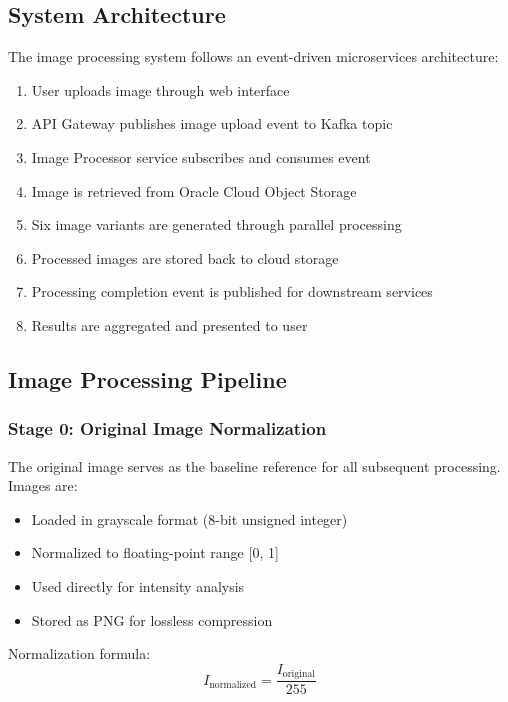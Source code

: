\documentclass[12pt,a4paper]{article}
\begin{document}
\subsection{System Architecture}

The image processing system follows an event-driven microservices architecture:

\begin{enumerate}
    \item User uploads image through web interface
    \item API Gateway publishes image upload event to Kafka topic
    \item Image Processor service subscribes and consumes event
    \item Image is retrieved from Oracle Cloud Object Storage
    \item Six image variants are generated through parallel processing
    \item Processed images are stored back to cloud storage
    \item Processing completion event is published for downstream services
    \item Results are aggregated and presented to user
\end{enumerate}

\subsection{Image Processing Pipeline}

\subsubsection{Stage 0: Original Image Normalization}

The original image serves as the baseline reference for all subsequent processing. Images are:
\begin{itemize}
    \item Loaded in grayscale format (8-bit unsigned integer)
    \item Normalized to floating-point range [0, 1]
    \item Used directly for intensity analysis
    \item Stored as PNG for lossless compression
\end{itemize}

Normalization formula:
\begin{equation}
I_{\text{normalized}} = \frac{I_{\text{original}}}{255}
\end{equation}
\end{document}
